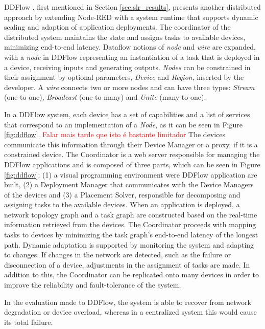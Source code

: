 \par DDFlow \cite{ddflow}, first mentioned in Section \ref{sec:slr_results}, presents another distributed approach by extending Node-RED with a system runtime that supports dynamic scaling and adaption of application deployments. The coordinator of the distributed system maintains the state and assigns tasks to available devices, minimizing end-to-end latency. Dataflow notions of \textit{node} and \textit{wire} are expanded, with a \textit{node} in DDFlow representing an instantiation of a task that is deployed in a device, receiving inputs and generating outputs. \textit{Nodes} can be constrained in their assignment by optional parameters, \textit{Device} and \textit{Region}, inserted by the developer. A \textit{wire} connects two or more nodes and can have three types: \textit{Stream} (one-to-one), \textit{Broadcast} (one-to-many) and \textit{Unite} (many-to-one). 
\par In a DDFlow system, each device has a set of capabilities and a list of services that correspond to an implementation of a \textit{Node}, as it can be seen in Figure \ref{fig:ddflow}. \textcolor{red}{Falar mais tarde que isto é bastante limitador} The devices communicate this information through their Device Manager or a proxy, if it is a constrained device. The Coordinator is a web server responsible for managing the DDFlow applications and is composed of three parts, which can be seen in Figure \ref{fig:ddflow}: (1) a visual programming environment were DDFlow application are built, (2) a Deployment Manager that communicates with the Device Managers of the devices and (3) a Placement Solver, responsible for decomposing and assigning tasks to the available devices. When an application is deployed, a network topology graph and a task graph are constructed based on the real-time information retrieved from the devices. The Coordinator proceeds with mapping tasks to devices by minimizing the task graph's end-to-end latency of the longest path. Dynamic adaptation is supported by monitoring the system and adapting to changes. If changes in the network are detected, such as the failure or disconnection of a device, adjustments in the assignment of tasks are made. In addition to this, the Coordinator can be replicated onto many devices in order to improve the reliability and fault-tolerance of the system.
\par In the evaluation made to DDFlow, the system is able to recover from network degradation or device overload, whereas in a centralized system this would cause its total failure.

